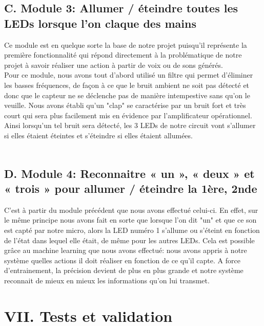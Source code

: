 \documentclass[a4paper,11pt]{book}
\begin{document}
\subsection*{C. Module 3: Allumer / éteindre toutes les LEDs lorsque l’on claque des mains }

Ce module est en quelque sorte la base de notre projet puisqu'il représente la première fonctionnalité qui répond directement à la problématique de notre projet à savoir réaliser une action à partir de voix ou de sons générés. \\ 
Pour ce module, nous avons tout d'abord utilisé un filtre qui permet d'éliminer les basses fréquences, de façon à ce que le bruit ambient ne soit pas détecté et donc que le capteur ne se déclenche pas de manière intempestive sans qu'on le veuille. Nous avons établi qu'un "clap" se caractérise par un bruit fort et très court qui sera plus facilement mis en évidence par l'amplificateur opérationnel. Ainsi lorsqu'un tel bruit sera détecté, les 3 LEDs de notre circuit vont s'allumer si elles étaient éteintes et s'éteindre si elles étaient allumées. \\ \\

\subsection*{D. Module 4: Reconnaitre « un », « deux » et « trois » pour allumer / éteindre la 1ère, 2nde }

C'est à partir du module précédent que nous avons effectué celui-ci. En effet, sur le même principe nous avons fait en sorte que lorsque l'on dit "un" et que ce son est capté par notre micro, alors la LED numéro 1 s'allume ou s'éteint en fonction de l'état dans lequel elle était, de même pour les autres LEDs. Cela est possible grâce au machine learning que nous avons effectué: nous avons appris à notre système quelles actions il doit réaliser en fonction de ce qu'il capte. A force d'entrainement, la précision devient de plus en plus grande et notre système reconnait de mieux en mieux les informations qu'on lui transmet.


\section*{VII. Tests et validation}

\vspace{2mm}
\end{document}
